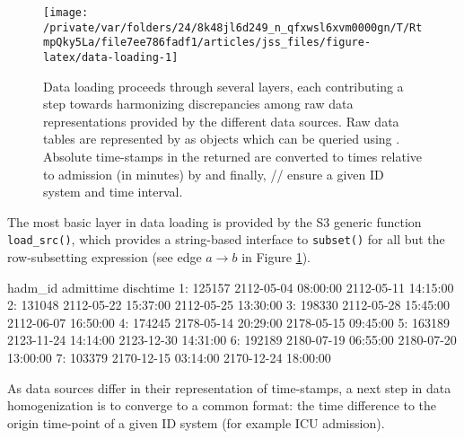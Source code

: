 \documentclass[
  notitle]{jss}
\begin{document}
\begin{CodeChunk}
\begin{figure}

{\centering \texttt{[image: /private/var/folders/24/8k48jl6d249\_n\_qfxwsl6xvm0000gn/T/RtmpQky5La/file7ee786fadf1/articles/jss\_files/figure-latex/data-loading-1]} 

}

\caption{Data loading proceeds through several layers, each contributing a step towards harmonizing discrepancies among raw data representations provided by the different data sources. Raw data tables are represented by  as  objects which can be queried using . Absolute time-stamps in the returned  are converted to times relative to admission (in minutes) by  and finally, /\allowbreak{}/\allowbreak{} ensure a given ID system and time interval.}\label{fig:data-loading}
\end{figure}
\end{CodeChunk}

The most basic layer in data loading is provided by the S3 generic
function \texttt{load\_src()}, which provides a string-based interface
to \texttt{subset()} for all but the row-subsetting expression (see edge
\(a \to b\) in Figure \ref{fig:data-loading}).

\begin{CodeChunk}
\begin{CodeOutput}
   hadm_id           admittime           dischtime
1:  125157 2112-05-04 08:00:00 2112-05-11 14:15:00
2:  131048 2112-05-22 15:37:00 2112-05-25 13:30:00
3:  198330 2112-05-28 15:45:00 2112-06-07 16:50:00
4:  174245 2178-05-14 20:29:00 2178-05-15 09:45:00
5:  163189 2123-11-24 14:14:00 2123-12-30 14:31:00
6:  192189 2180-07-19 06:55:00 2180-07-20 13:00:00
7:  103379 2170-12-15 03:14:00 2170-12-24 18:00:00
\end{CodeOutput}
\end{CodeChunk}

As data sources differ in their representation of time-stamps, a next
step in data homogenization is to converge to a common format: the time
difference to the origin time-point of a given ID system (for example
ICU admission).
\end{document}
